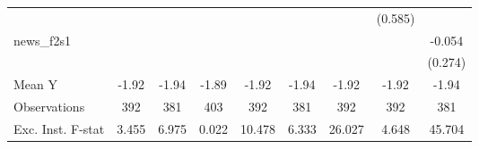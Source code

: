 {\begin{tabular}{l*{8}{c}}
            &                     &                     &                     &                     &                     &                     &     (0.585)         &                     \\
\addlinespace
news\_f2s1   &                     &                     &                     &                     &                     &                     &                     &      -0.054         \\
            &                     &                     &                     &                     &                     &                     &                     &     (0.274)         \\
\midrule
Mean Y      &       -1.92         &       -1.94         &       -1.89         &       -1.92         &       -1.94         &       -1.92         &       -1.92         &       -1.94         \\
Observations&         392         &         381         &         403         &         392         &         381         &         392         &         392         &         381         \\
Exc. Inst. F-stat&       3.455         &       6.975         &       0.022         &      10.478         &       6.333         &      26.027         &       4.648         &      45.704         \\
\bottomrule
\end{tabular}
}
